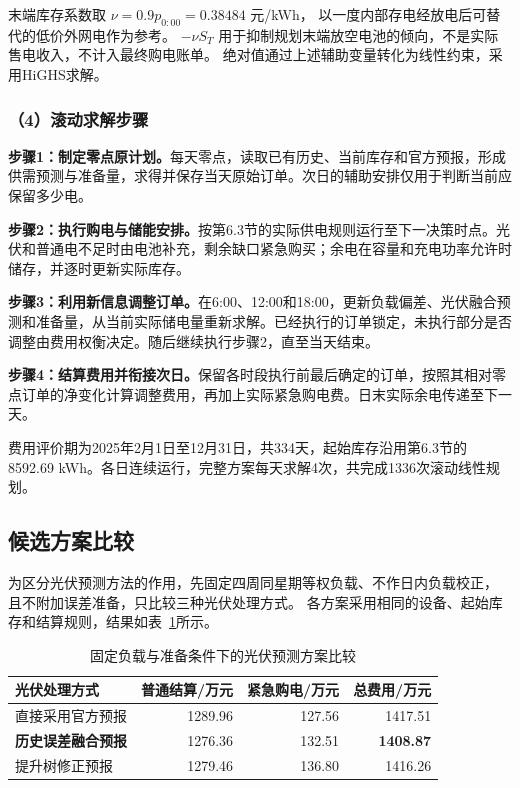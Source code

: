 末端库存系数取 $\nu=0.9p_{0:00}=0.38484$ 元/kWh，
以一度内部存电经放电后可替代的低价外网电作为参考。
$-\nu S_T$ 用于抑制规划末端放空电池的倾向，不是实际售电收入，不计入最终购电账单。
绝对值通过上述辅助变量转化为线性约束，采用HiGHS求解。

\subsubsection*{（4）滚动求解步骤}

\noindent\textbf{步骤1：制定零点原计划。}每天零点，读取已有历史、当前库存和官方预报，形成供需预测与准备量，求得并保存当天原始订单。次日的辅助安排仅用于判断当前应保留多少电。

\noindent\textbf{步骤2：执行购电与储能安排。}按第6.3节的实际供电规则运行至下一决策时点。光伏和普通电不足时由电池补充，剩余缺口紧急购买；余电在容量和充电功率允许时储存，并逐时更新实际库存。

\noindent\textbf{步骤3：利用新信息调整订单。}在6:00、12:00和18:00，更新负载偏差、光伏融合预测和准备量，从当前实际储电量重新求解。已经执行的订单锁定，未执行部分是否调整由费用权衡决定。随后继续执行步骤2，直至当天结束。

\noindent\textbf{步骤4：结算费用并衔接次日。}保留各时段执行前最后确定的订单，按照其相对零点订单的净变化计算调整费用，再加上实际紧急购电费。日末实际余电传递至下一天。

费用评价期为2025年2月1日至12月31日，共334天，起始库存沿用第6.3节的8592.69 kWh。各日连续运行，完整方案每天求解4次，共完成1336次滚动线性规划。

\subsection{候选方案比较}

为区分光伏预测方法的作用，先固定四周同星期等权负载、不作日内负载校正，
且不附加误差准备，只比较三种光伏处理方式。
各方案采用相同的设备、起始库存和结算规则，结果如表~\ref{tab:q3_candidate}所示。

\begin{table}[!htbp]
\centering
\caption{固定负载与准备条件下的光伏预测方案比较}
\label{tab:q3_candidate}
\begin{tabular}{lrrr}
\toprule
光伏处理方式 & 普通结算/万元 & 紧急购电/万元 & 总费用/万元\\
\midrule
直接采用官方预报 &1289.96&127.56&1417.51\\
\textbf{历史误差融合预报} &1276.36&132.51&\textbf{1408.87}\\
提升树修正预报 &1279.46&136.80&1416.26\\
\bottomrule
\end{tabular}
\end{table}

